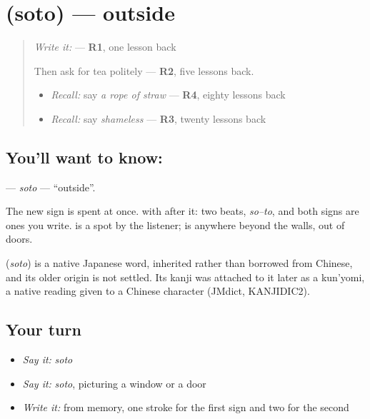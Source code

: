 \section[\texorpdfstring{\ja{そと} (soto)}{そと (soto)}]{ (soto) — outside}

\label{lesson:JA-C132-soto}



\begin{quote}
\emph{Write it:} \textbf{} — \textbf{R1}, one lesson back

Then ask for tea politely — \textbf{R2}, five lessons back.

\begin{itemize}
\raggedright
  \item \emph{Recall:} say \emph{a rope of straw} — \textbf{R4}, eighty lessons back
  \item \emph{Recall:} say \emph{shameless} — \textbf{R3}, twenty lessons back
\end{itemize}
\end{quote}

\subsection*{You'll want to know: }
\textbf{} — \emph{soto} — \textquotedblleft{}outside\textquotedblright{}.

The new sign is spent at once. \textbf{} with \textbf{} after it: two beats, \emph{so–to}, and both signs are ones you write. \textbf{} is a spot by the listener; \textbf{} is anywhere beyond the walls, out of doors.

\begin{cousinweb}
\textbf{} (\emph{soto}) is a native Japanese word, inherited rather than borrowed from Chinese, and its older origin is not settled. Its kanji was attached to it later as a kun'yomi, a native reading given to a Chinese character (JMdict, KANJIDIC2).
\end{cousinweb}

\subsection*{Your turn}
\begin{itemize}
\raggedright
  \item \emph{Say it:} \emph{soto}
  \item \emph{Say it:} \emph{soto}, picturing a window or a door
  \item \emph{Write it:} \textbf{} from memory, one stroke for the first sign and two for the second
\end{itemize}

